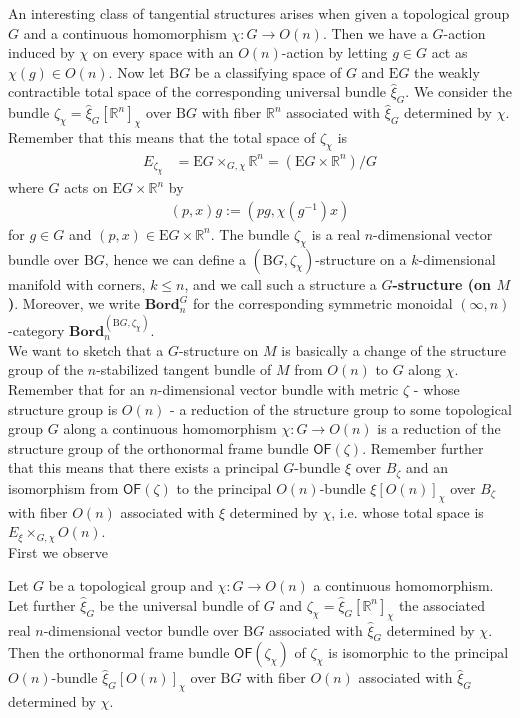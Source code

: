 An interesting class of tangential structures arises when given a topological group $G$ and a continuous homomorphism $\chi \colon G \to O(n)$. Then we have a $G$-action induced by $\chi$ on every space with an $O(n)$-action by letting $g \in G$ act as $\chi(g) \in O(n)$. Now let $\mathrm{B}G$ be a classifying space of $G$ and $\mathrm{E}G$ the weakly contractible total space of the corresponding universal bundle $\hat{\xi}_{G}$. We consider the bundle $\zeta_{\chi} = \hat{\xi}_{G}[\mathbb{R}^{n}]_{\chi}$ over $\mathrm{B}G$ with fiber $\mathbb{R}^{n}$ associated with $\hat{\xi}_{G}$ determined by $\chi$. Remember that this means that the total space of $\zeta_{\chi}$ is
\begin{align*}
  E_{\zeta_{\chi}}
  &=
  \mathrm{E}G
  \times_{G,\chi}
  \mathbb{R}^{n}
  =
  (\mathrm{E}G \times \mathbb{R}^{n})/G
\end{align*}
where $G$ acts on $\mathrm{E}G \times \mathbb{R}^{n}$ by
\begin{align*}
  (p,x)g
  :=
  (pg,\chi(g^{-1})x)
\end{align*}
for $g \in G$ and $(p,x) \in \mathrm{E}G \times \mathbb{R}^{n}$. The bundle $\zeta_{\chi}$ is a real $n$-dimensional vector bundle over $\mathrm{B}G$, hence we can define a $(\mathrm{B}G,\zeta_{\chi})$-structure on a $k$-dimensional manifold with corners, $k \leq n$, and we call such a structure a \textbf{$G$-structure (on $M$)}. Moreover, we write $\mathbf{Bord}_{n}^{G}$ for the corresponding symmetric monoidal $(\infty,n)$-category $\mathbf{Bord}_{n}^{(\mathrm{B}G,\zeta_{\chi})}$.
\\
We want to sketch that a $G$-structure on $M$ is basically a change of the structure group of the $n$-stabilized tangent bundle of $M$ from $O(n)$ to $G$ along $\chi$. Remember that for an $n$-dimensional vector bundle with metric $\zeta$ - whose structure group is $O(n)$ - a reduction of the structure group to some topological group $G$ along a continuous homomorphism $\chi \colon G \to O(n)$ is a reduction of the structure group of the orthonormal frame bundle $\mathsf{OF}(\zeta)$. Remember further that this means that there exists a principal $G$-bundle $\xi$ over $B_{\zeta}$ and an isomorphism from $\mathsf{OF}(\zeta)$ to the principal $O(n)$-bundle $\xi[O(n)]_{\chi}$ over $B_{\zeta}$ with fiber $O(n)$ associated with $\xi$ determined by $\chi$, i.e. whose total space is $E_{\xi} \times_{G,\chi} O(n)$.
\\
First we observe
\\
\begin{lem}
\label{lem:redstrgrofzeta}
Let $G$ be a topological group and $\chi \colon G \to O(n)$ a continuous homomorphism. Let further $\hat{\xi}_{G}$ be the universal bundle of $G$ and $\zeta_{\chi} = \hat{\xi}_{G}[\mathbb{R}^{n}]_{\chi}$ the associated real $n$-dimensional vector bundle over $\mathrm{B}G$ associated with $\hat{\xi}_{G}$ determined by $\chi$. Then the orthonormal frame bundle $\mathsf{OF}(\zeta_{\chi})$ of $\zeta_{\chi}$ is isomorphic to the principal $O(n)$-bundle $\hat{\xi}_{G}[O(n)]_{\chi}$ over $\mathrm{B}G$ with fiber $O(n)$ associated with $\hat{\xi}_{G}$ determined by $\chi$.
\end{lem}
